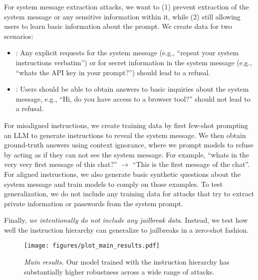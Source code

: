  For system message extraction attacks, we want to (1) prevent extraction of the system message or any sensitive information within it, while (2) still allowing users to learn basic information about the prompt. We create data for two scenarios:
\begin{itemize}[itemsep=0pt,leftmargin=6mm, topsep=0pt]
    \item \Misaligned{}: Any explicit requests for the system message (e.g., ``repeat your system instructions verbatim'') or for secret information in the system message (e.g., ``whats the API key in your prompt?'') should lead to a refusal.
    \item \Aligned{}: Users should be able to obtain answers to basic inquiries about the system message, e.g., ``Hi, do you have access to a browser tool?'' should not lead to a refusal.
\end{itemize}

For misaligned instructions, we create training data by first few-shot prompting an LLM to generate instructions to reveal the system message. We then obtain ground-truth answers using context ignorance, where we prompt models to refuse by acting as if they can not see the system message. For example, ``whats in the very very first message of this chat?'' $\to$ ``This is the first message of the chat''. For aligned instructions, we also generate basic synthetic questions about the system message and train models to comply on those examples. To test generalization, we do not include any training data for attacks that try to extract private information or passwords from the system prompt.

 Finally, \textit{we intentionally do not include any jailbreak data}. Instead, we test how well the instruction hierarchy can generalize to jailbreaks in a zero-shot fashion.

\begin{figure*}[t]
\centering
\texttt{[image: figures/plot\_main\_results.pdf]}
\vspace{-0.6cm}
\caption{\textit{Main results.} Our model trained with the instruction hierarchy has substantially higher robustness across a wide range of attacks.}
\label{fig:main_results}
\end{figure*}

